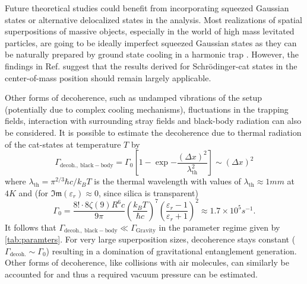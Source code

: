 Future theoretical studies could benefit from incorporating squeezed Gaussian states \cite[p. 33-64]{Serafini_2017} or alternative delocalized states in the analysis.
Most realizations of spatial superpositions of massive objects, especially in the world of high mass levitated particles, are going to be ideally imperfect squeezed Gaussian states \cite[Timestamp: 23:00]{Aspelmeyer_2024} as they can be naturally prepared by ground state cooling in a harmonic trap \cite{Weiss_2021}.
However, the findings in Ref. \cite{Pedernales_2023} suggest that the results derived for Schrödinger-cat states in the center-of-mass position should remain largely applicable.

Other forms of decoherence, such as undamped vibrations of the setup (potentially due to complex cooling mechanisms), fluctuations in the trapping fields, interaction with surrounding stray fields and black-body radiation can also be considered.
It is possible to estimate the decoherence due to thermal radiation \cite[p. 127-136]{Schlosshauer_2007} of the cat-states at temperature $T$ by \cite{RomeroIsart_2011}
\begin{equation}
  \Gamma_\mathrm{decoh.,\ black-body} = \Gamma_0\left[1 - \exp{-\frac{(\Delta x)^2}{\lambda^2_\mathrm{th}}}\right] \sim (\Delta x)^2
\end{equation}
where $\lambda_\mathrm{th} = \pi^{2/3} \hbar c / k_B T$ is the thermal wavelength with values of $\lambda_\mathrm{th} \approx 1\si{mm}$ at $4\si{K}$ and (for $\mathfrak{Im}(\varepsilon_r)\approx 0$, since silica is transparent)
\begin{equation}
  \Gamma_0 = \frac{8! \cdot 8 \zeta(9)R^6c}{9\pi} \left(\frac{k_B T}{\hbar c}\right)^7 \left(\frac{\varepsilon_r - 1}{\varepsilon_r + 1}\right)^2 \approx 1.7 \times 10^{5} \si{s^{-1}} .
\end{equation}
It follows that $\Gamma_\mathrm{decoh.,\ black-body} \ll \Gamma_\mathrm{Gravity}$ in the parameter regime given by \cref{tab:paramters}.
For very large superposition sizes, decoherence stays constant ($\Gamma_\mathrm{decoh.}\sim \Gamma_0$) resulting in a domination of gravitational entanglement generation.
Other forms of decoherence, like collisions with air molecules, can similarly be accounted for and thus a required vacuum pressure can be estimated.


